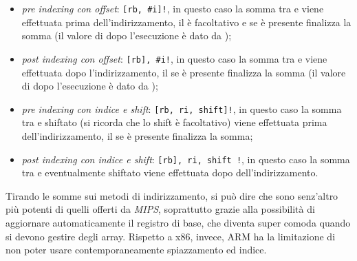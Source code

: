\documentclass[class=book, crop=false, oneside]{standalone}
\begin{document}
\begin{itemize}
	\item \emph{pre indexing con offset}: \texttt{[rb, \#i]!}, in questo caso la somma tra  e  viene  effettuata prima dell'indirizzamento, il \register{!} è facoltativo e se è presente finalizza la somma (il valore di  dopo l'esecuzione è dato da );
	\item \emph{post indexing con offset}: \texttt{[rb], \#i!}, in questo caso la somma tra  e  viene effettuata dopo l'indirizzamento, il \suffix{!} se è presente finalizza la somma (il valore di  dopo l'esecuzione è dato da );
	\item \emph{pre indexing con indice e shift}: \texttt{[rb, ri, shift]!}, in questo caso la somma tra  e  shiftato (si ricorda che lo shift è facoltativo) viene  effettuata prima dell'indirizzamento, il \suffix{!} se è presente finalizza la somma;
	\item \emph{post indexing con indice e shift}: \texttt{[rb], ri, shift !}, in questo caso la somma tra  e  eventualmente shiftato viene effettuata dopo dell'indirizzamento.
\end{itemize}
Tirando le somme sui metodi di indirizzamento, si può dire che sono senz'altro più potenti di quelli offerti da \emph{MIPS}, soprattutto grazie alla possibilità di aggiornare automaticamente il registro di base, che diventa super comoda quando si devono gestire degli array. Rispetto a x86, invece, ARM ha la limitazione di non poter usare contemporaneamente spiazzamento ed indice.
\end{document}
